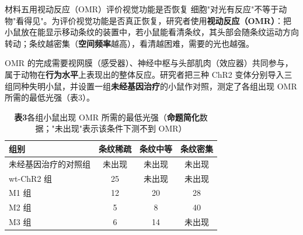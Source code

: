 \documentclass[UTF8,a4paper,11pt]{ctexart}
\newcommand{\key}[1]{\textbf{\color{deepred}#1}}
\begin{document}
\begin{matbox}{材料五\quad 用视动反应（OMR）评价视觉功能是否恢复}
细胞"对光有反应"不等于动物"看得见"。为评价视觉功能是否真正恢复，研究者使用\textbf{视动反应（OMR）}：把小鼠放在能显示移动条纹的装置中，若小鼠能看清条纹，其头部会随条纹运动方向转动；条纹越密集（\textbf{空间频率}越高），看清越困难，需要的光也越强。

OMR 的完成需要视网膜（感受器）、神经中枢与头部肌肉（效应器）共同参与，属于动物在\textbf{行为水平}上表现出的整体反应。研究者把三种 ChR2 变体分别导入三组同种失明小鼠，并设置一组\textbf{未经基因治疗}的小鼠作对照，测定了各组出现 OMR 所需的最低光强（表3）。
\end{matbox}

\begin{table}[H]
\centering\small
\caption*{\textbf{表3}\quad 各组小鼠出现 OMR 所需的最低光强（\key{命题简化}数据；"未出现"表示该条件下测不到 OMR）}
\begin{tabular}{@{}lccc@{}}
\toprule
\textbf{组别} & \textbf{条纹稀疏} & \textbf{条纹中等} & \textbf{条纹密集} \\
\midrule
未经基因治疗的对照组 & 未出现 & 未出现 & 未出现 \\
wt-ChR2 组 & 25 & 未出现 & 未出现 \\
M1 组 & 12 & 20 & 28 \\
M2 组 & 5 & 8 & 40 \\
M3 组 & 6 & 14 & 未出现 \\
\bottomrule
\end{tabular}
\end{table}
\end{document}
